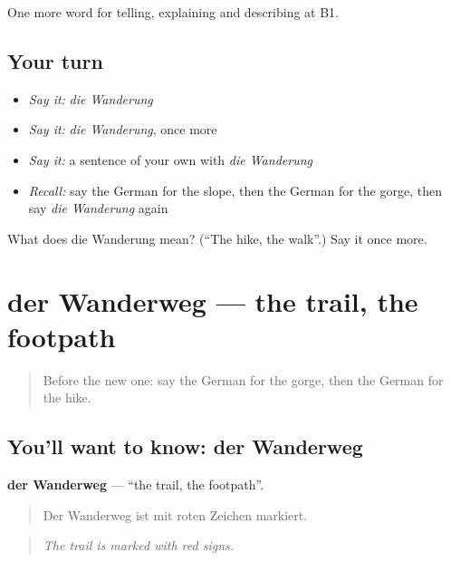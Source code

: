 \begin{grammarlens}[title={What you've built}]
One more word for telling, explaining and describing at B1.
\end{grammarlens}

\subsection*{Your turn}
\begin{itemize}
\raggedright
  \item \emph{Say it:} \emph{die Wanderung}
  \item \emph{Say it:} \emph{die Wanderung}, once more
  \item \emph{Say it:} a sentence of your own with \emph{die Wanderung}
  \item \emph{Recall:} say the German for the slope, then the German for the gorge, then say \emph{die Wanderung} again
\end{itemize}

\begin{tcolorbox}[breakable,colback=teal!4,colframe=teal!35!black,title={Before you move on}]
What does die Wanderung mean? (\textquotedblleft{}The hike, the walk\textquotedblright{}.) Say it once more.
\end{tcolorbox}
\section[der Wanderweg]{der Wanderweg — the trail, the footpath}

\label{lesson:GE-C454-wanderweg}



\begin{quote}
Before the new one: say the German for the gorge, then the German for the hike.
\end{quote}

\subsection*{You'll want to know: der Wanderweg}
\textbf{der Wanderweg} — \textquotedblleft{}the trail, the footpath\textquotedblright{}.

\begin{quote}
Der Wanderweg ist mit roten Zeichen markiert.
\end{quote}

\begin{quote}
\emph{The trail is marked with red signs.}
\end{quote}


